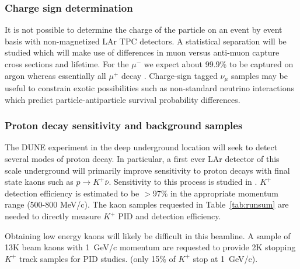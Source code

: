 
\subsubsection{Charge sign determination}

It is not possible to determine the charge of the particle on an event by event basis with non-magnetized LAr TPC detectors. A statistical separation will be studied which will make use of differences in muon versus anti-muon capture cross sections and lifetime.
For the $\mu^-$ we expect about 99.9\% to be captured on argon whereas essentially all $\mu^+$ decay \cite{stopmu}.
Charge-sign tagged $\nu_\mu$ samples may be useful to constrain exotic possibilities such as
non-standard neutrino interactions which predict particle-antiparticle survival probability differences. 


\subsubsection{Proton decay sensitivity and background samples}


The DUNE experiment in the deep underground location will seek to detect several modes of proton decay.
In particular, a first ever LAr detector of this scale underground will primarily improve sensitivity to 
proton decays with final state kaons such as  $p \rightarrow K^+ \overline{\nu}$. 
Sensitivity to this process is studied in \cite{bueno}. $K^+$ detection efficiency is estimated to be $>$97\% in the
appropriate momentum range (500-800 MeV/c). The kaon samples requested in Table~\ref{tab:runsum} are needed to directly measure 
$K^+$ PID and detection efficiency. 

Obtaining low energy kaons will likely be difficult in this beamline.
A sample of 13K beam kaons with 1~GeV/c momentum are requested to provide 2K stopping $K^+$ track samples for PID studies.
(only 15\% of $K^+$ stop at 1~GeV/c).


